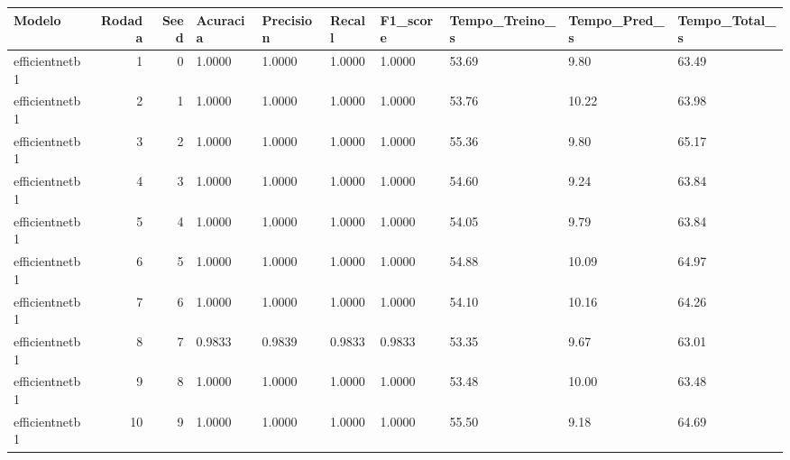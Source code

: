 \begin{tabular}{lrrlllllll}
\toprule
Modelo & Rodada & Seed & Acuracia & Precision & Recall & F1_score & Tempo_Treino_s & Tempo_Pred_s & Tempo_Total_s \\
\midrule
efficientnetb1 & 1 & 0 & 1.0000 & 1.0000 & 1.0000 & 1.0000 & 53.69 & 9.80 & 63.49 \\
efficientnetb1 & 2 & 1 & 1.0000 & 1.0000 & 1.0000 & 1.0000 & 53.76 & 10.22 & 63.98 \\
efficientnetb1 & 3 & 2 & 1.0000 & 1.0000 & 1.0000 & 1.0000 & 55.36 & 9.80 & 65.17 \\
efficientnetb1 & 4 & 3 & 1.0000 & 1.0000 & 1.0000 & 1.0000 & 54.60 & 9.24 & 63.84 \\
efficientnetb1 & 5 & 4 & 1.0000 & 1.0000 & 1.0000 & 1.0000 & 54.05 & 9.79 & 63.84 \\
efficientnetb1 & 6 & 5 & 1.0000 & 1.0000 & 1.0000 & 1.0000 & 54.88 & 10.09 & 64.97 \\
efficientnetb1 & 7 & 6 & 1.0000 & 1.0000 & 1.0000 & 1.0000 & 54.10 & 10.16 & 64.26 \\
efficientnetb1 & 8 & 7 & 0.9833 & 0.9839 & 0.9833 & 0.9833 & 53.35 & 9.67 & 63.01 \\
efficientnetb1 & 9 & 8 & 1.0000 & 1.0000 & 1.0000 & 1.0000 & 53.48 & 10.00 & 63.48 \\
efficientnetb1 & 10 & 9 & 1.0000 & 1.0000 & 1.0000 & 1.0000 & 55.50 & 9.18 & 64.69 \\
\bottomrule
\end{tabular}
